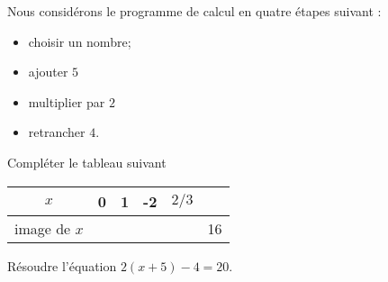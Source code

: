 
\begin{exercice}\label{exoSeconde-0042}

    Nous considérons le programme de calcul en quatre étapes suivant :
    \begin{itemize}
        \item
            choisir un nombre;
        \item
            ajouter \( 5\)
        \item
            multiplier par \( 2\)
        \item
            retrancher \( 4\).
    \end{itemize}
    Compléter le tableau suivant
    \begin{center}
        \begin{tabular}[h]{|c||c|c|c|c|c|}
            \hline
            \( x\)&0&1&-2&$2/3$&\\
            \hline
            image de \( x\)& & & & & 16\\
            \hline
        \end{tabular}
    \end{center}

    Résoudre l'équation \( 2(x+5)-4=20\).

\end{exercice}

